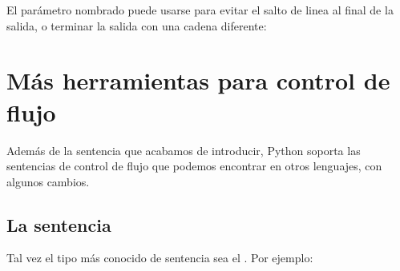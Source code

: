 \documentclass[a5paper,10pt,spanish]{sphinxmanual}
\begin{document}
\begin{itemize}
\begin{sphinxVerbatim}[commandchars=\\\{\}]
  
 
\end{sphinxVerbatim}

\sphinxAtStartPar
El parámetro nombrado  puede usarse para evitar el salto de linea al final de la salida, o terminar la salida con una cadena diferente:

\begin{sphinxVerbatim}[commandchars=\\\{\}]
    
   
     
        
\end{sphinxVerbatim}

\end{itemize}


\chapter{Más herramientas para control de flujo}
\label{\detokenize{tutorial/controlflow:more-control-flow-tools}}\label{\detokenize{tutorial/controlflow:tut-morecontrol}}\label{\detokenize{tutorial/controlflow::doc}}
\sphinxAtStartPar
Además de la sentencia  que acabamos de introducir, Python soporta las sentencias de control de flujo que podemos encontrar en otros lenguajes, con algunos cambios.


\section{La sentencia }
\label{\detokenize{tutorial/controlflow:if-statements}}\label{\detokenize{tutorial/controlflow:tut-if}}
\sphinxAtStartPar
Tal vez el tipo más conocido de sentencia sea el . Por ejemplo:
\end{document}
